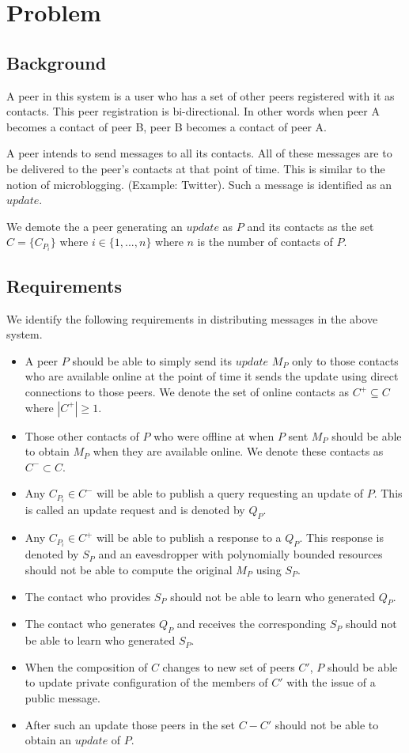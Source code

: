 \section{Problem}


\subsection{Background}
A peer in this system is a user who has a set of other peers registered with it as contacts. This peer registration is bi-directional. In other words when peer A becomes a contact of peer B, peer B becomes a contact of peer A. 

A peer intends to send messages to all its contacts. All of these messages are to be delivered to the peer's contacts at that point of time. This is similar to the notion of microblogging. (Example: Twitter\cite{twitter}). Such a message is identified as an $update$.

We demote the a peer generating an $update$ as $P$ and its contacts as the set $C = \{C_{P_i}\}$ where $i \in \{1 , ..., n\}$ where $n$ is the number of contacts of $P$.

\subsection{Requirements}
We identify the following requirements in distributing messages in the above system.
\begin{itemize}
	\item A peer $P$ should be able to simply send its $update$ $M_P$ only to those contacts who are available online at the point of time it sends the update using direct connections to those peers. We denote the set of online contacts as  ${C^+} \subseteq C$ where $|{C^+}| \geq 1$.
	\item Those other contacts of $P$ who were offline at when $P$ sent $M_P$ should be able to obtain $M_P$ when they are available online. We denote these contacts as ${C^-} \subset C$.
	\item Any $C_{P_i} \in C^-$ will be able to publish a query requesting an update of $P$. This is called an update request and is denoted by $Q_P$.
	\item Any  $C_{P_i} \in C^+$ will be able to publish a response to a $Q_P$. This response is denoted by $S_P$ and an eavesdropper with polynomially bounded resources should not be able to compute the original $M_P$ using $S_P$.
	\item The contact who provides $S_P$ should not be able to learn who generated $Q_P$.
	\item The contact who generates $Q_P$ and receives the corresponding $S_P$ should not be able to learn who generated $S_P$.
	\item When the composition of $C$ changes to new set of peers $C'$, $P$ should be able to update private configuration of the members of $C'$ with the issue of a public message.
	\item After such an update those peers in the set $C - C'$ should not be able to obtain an $update$ of $P$.
\end{itemize}

